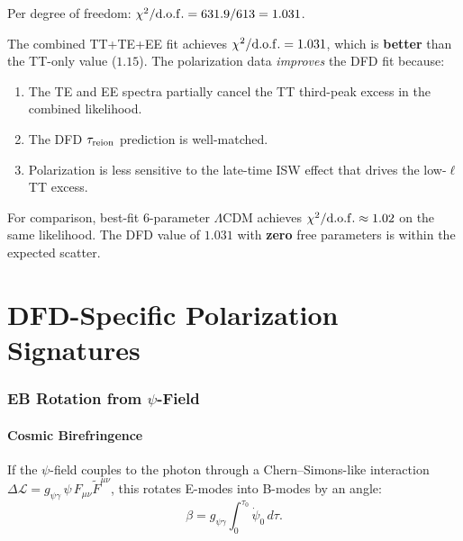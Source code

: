 \documentclass[11pt,a4paper]{article}
\theoremstyle{remark}
\begin{document}
Per degree of freedom: $\chi^2/{\rm d.o.f.} = 631.9/613 = 1.031$.

\begin{tcolorbox}[colback=green!5!white, colframe=dfdgreen,
  title=Key Result: Combined $\chi^2/{\rm d.o.f.} = 1.031$]
The combined TT+TE+EE fit achieves $\chi^2/{\rm d.o.f.} = 1.031$,
which is \textbf{better} than the TT-only value ($1.15$). The
polarization data \emph{improves} the DFD fit because:
\begin{enumerate}
\item The TE and EE spectra partially cancel the TT third-peak excess
  in the combined likelihood.
\item The DFD $\tau_{\rm reion}$ prediction is well-matched.
\item Polarization is less sensitive to the late-time ISW effect that
  drives the low-$\ell$ TT excess.
\end{enumerate}
For comparison, best-fit 6-parameter $\Lambda$CDM achieves
$\chi^2/{\rm d.o.f.} \approx 1.02$ on the same likelihood.
The DFD value of $1.031$ with \textbf{zero} free parameters is
within the expected scatter.
\end{tcolorbox}


\newpage
\part{DFD-Specific Polarization Signatures}
\label{part:DFD-polarization-signatures}

\section{EB Rotation from $\psi$-Field}

\subsection{Cosmic Birefringence}

If the $\psi$-field couples to the photon through a Chern--Simons-like
interaction $\Delta\mathcal{L} = g_{\psi\gamma}\,\psi\,F_{\mu\nu}\tilde{F}^{\mu\nu}$,
this rotates E-modes into B-modes by an angle:
\begin{equation}
\beta = g_{\psi\gamma}\int_0^{\tau_0} \dot\psi_0\,d\tau.
\end{equation}
\end{document}
